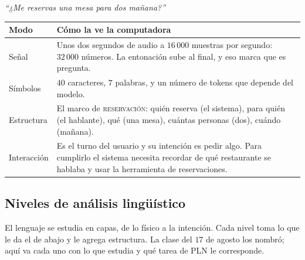 \documentclass[11pt,letterpaper]{article}
\begin{document}
\begin{ejemplo}
    \textit{``¿Me reservas una mesa para dos mañana?''}
    \begin{center}
    \small
    \begin{tabular}{l>{\raggedright\arraybackslash}p{10.5cm}}
        \toprule
        \textbf{Modo} & \textbf{Cómo la ve la computadora} \\
        \midrule
        Señal & Unos dos segundos de audio a $16\,000$ muestras por
                segundo: $32\,000$ números. La entonación sube al
                final, y eso marca que es pregunta. \\
        \addlinespace
        Símbolos & $40$ caracteres, $7$ palabras, y un número de
                   tokens que depende del modelo. \\
        \addlinespace
        Estructura & El marco de \textsc{reservación}: quién reserva
                     (el sistema), para quién (el hablante), qué (una
                     mesa), cuántas personas (dos), cuándo (mañana). \\
        \addlinespace
        Interacción & Es el turno del usuario y su intención es pedir
                      algo. Para cumplirlo el sistema necesita recordar
                      de qué restaurante se hablaba y usar la
                      herramienta de reservaciones. \\
        \bottomrule
    \end{tabular}
    \end{center}
\end{ejemplo}


\subsection*{Niveles de análisis lingüístico}

El lenguaje se estudia en capas, de lo físico a la intención. Cada
nivel toma lo que le da el de abajo y le agrega estructura. La clase
del $17$ de agosto los nombró; aquí va cada uno con lo que estudia y
qué tarea de PLN le corresponde.
\end{document}
